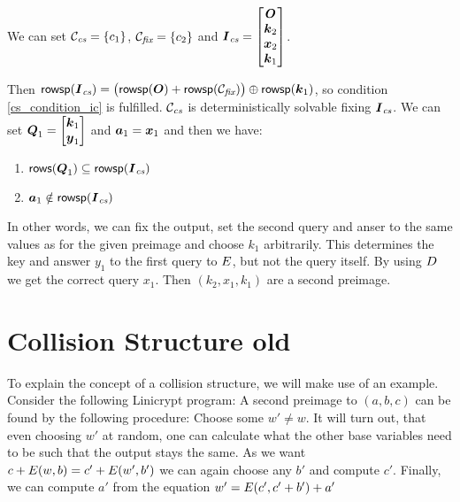 We can set $\mathcal{C}_\textit{cs} = \{c_1\}$, $\mathcal{C}_\textit{fix} = \{c_2\}$ and $\boldsymbol{I}_\textit{cs} = \begin{bmatrix}\boldsymbol{O} \\ \boldsymbol k_2 \\ \boldsymbol x_2 \\ \boldsymbol k_1\end{bmatrix}$.

Then $\mathsf{rowsp}(\boldsymbol{I}_\textit{cs}) = \big( \mathsf{rowsp}(\boldsymbol{O}) + \mathsf{rowsp}(\mathcal{C}_\textit{fix}) \big) \oplus \mathsf{rowsp}(\boldsymbol k_1)$, so condition \eqref{cs_condition_ic} is fulfilled.
$\mathcal{C}_\textit{cs}$ is deterministically solvable fixing $\boldsymbol{I}_\textit{cs}$.
We can set $\boldsymbol{Q}_1 = \begin{bmatrix}\boldsymbol k_1 \\ \boldsymbol y_1\end{bmatrix}$ and $\boldsymbol a_1 = \boldsymbol x_1$ and then we have: 
\begin{enumerate}
    \item $\mathsf{rows}(\boldsymbol{Q}_1) \subseteq \mathsf{rowsp}(\boldsymbol{I}_\textit{cs})$
    \item $\boldsymbol a_1 \notin \mathsf{rowsp}(\boldsymbol{I}_\textit{cs})$
\end{enumerate}

In other words,
we can fix the output, set the second query and anser to the same values as for the given preimage and choose $k_1$ arbitrarily.
This determines the key and answer $y_1$ to the first query to $E$, but not the query itself.
By using $D$ we get the correct query $x_1$.
Then $(k_2, x_1, k_1)$ are a second preimage.



\section{Collision Structure old}

To explain the concept of a collision structure, we will make use of an example.
Consider the following Linicrypt program:
A second preimage to $(a,b,c)$ can be found by the following procedure:
Choose some $w' \neq w$.
It will turn out, that even choosing $w'$ at random,
one can calculate what the other base variables need to be such that the output stays the same.
As we want $c + E(w,b) = c' + E(w', b')$ we can again choose any $b'$ and compute $c'$. 
Finally, we can compute $a'$ from the equation $w' = E(c', c' + b') + a'$

